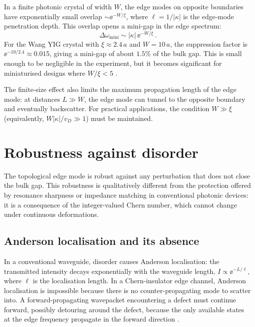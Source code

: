 In a finite photonic crystal of width $W$, the edge modes on opposite
boundaries have exponentially small overlap $\sim\ee^{-W/\xi}$, where
$\ell=1/|\kappa|$ is the edge-mode penetration depth.  This overlap
opens a mini-gap in the edge spectrum:
\begin{equation}\label{eq:ch8-minigap}
  \Delta\omega_{\mathrm{mini}}
  \sim |\kappa|\,\ee^{-W/\xi}\,.
\end{equation}
For the Wang YIG crystal with $\xi\approx 2.4\,a$ and $W=10\,a$, the
suppression factor is $\ee^{-10/2.4}\approx 0.015$, giving a
mini-gap of about $1.5\%$ of the bulk gap.  This is small enough to
be negligible in the experiment, but it becomes significant for
miniaturised designs where $W/\xi<5$
\cite{nature2026observation,price2022roadmap}.

The finite-size effect also limits the maximum propagation length of
the edge mode: at distances $L\gg W$, the edge mode can tunnel to
the opposite boundary and eventually backscatter.  For practical
applications, the condition $W\gg\xi$ (equivalently, $W|\kappa|/v_D
\gg 1$) must be maintained.

\section{Robustness against disorder}
\label{sec:ch8-robustness-disorder}

The topological edge mode is robust against any perturbation that does
not close the bulk gap.  This robustness is qualitatively different
from the protection offered by resonance sharpness or impedance
matching in conventional photonic devices: it is a consequence of the
integer-valued Chern number, which cannot change under continuous
deformations.

\subsection{Anderson localisation and its absence}
\label{sec:ch8-anderson}

In a conventional waveguide, disorder causes Anderson localisation:
the transmitted intensity decays exponentially with the waveguide
length, $I\propto\ee^{-L/\ell}$, where $\ell$ is the localisation
length.  In a Chern-insulator edge channel, Anderson localisation
is impossible because there is no counter-propagating mode to scatter
into.  A forward-propagating wavepacket encountering a defect must
continue forward, possibly detouring around the defect, because the
only available states at the edge frequency propagate in the forward
direction \cite{ozawa2018topological}.

